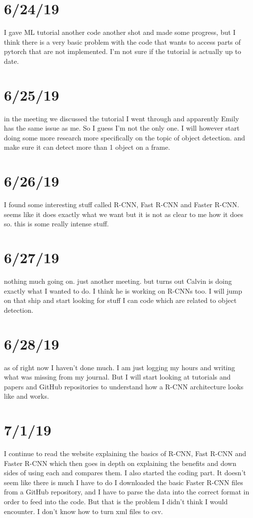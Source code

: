 \documentclass{article}
\begin{document}
\section{6/24/19}
I gave ML tutorial another code another shot and made some progress, but I think there is a very basic problem with the code that wants to access parts of pytorch that are not implemented. I’m not sure if the tutorial is actually up to date.

\section{6/25/19}
in the meeting we discussed the tutorial I went through and apparently Emily has the same issue as me. So I guess I’m not the only one. I will however start doing some more research more specifically on the topic of object detection. and make sure it can detect more than 1 object on a frame.

\section{6/26/19}
I found some interesting stuff called R-CNN, Fast R-CNN and Faster R-CNN. seems like it does exactly what we want but it is not as clear to me how it does so. this is some really intense stuff.

\section{6/27/19}
nothing much going on. just another meeting. but turns out Calvin is doing exactly what I wanted to do. I think he is working on R-CNNs too. I will jump on that ship and start looking for stuff I can code which are related to object detection.

\section{6/28/19}
as of right now I haven’t done much. I am just logging my hours and writing what was missing from my journal. But I will start looking at tutorials and papers and GitHub repositories to understand how a R-CNN architecture looks like and works.

\section{7/1/19}
I continue to read the website explaining the basics of R-CNN, Fast R-CNN and Faster R-CNN which then goes in depth on explaining the benefits and down sides of using each and compares them. I also started the coding part. It doesn’t seem like there is much I have to do I downloaded the basic Faster R-CNN files from a GitHub repository, and I have to parse the data into the correct format in order to feed into the code. But that is the problem I didn’t think I would encounter. I don’t know how to turn xml files to csv.
\end{document}
